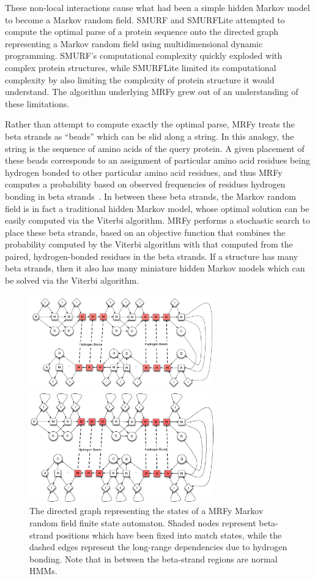 \documentclass[preprint,nonatbib,blockstyle,nocopyrightspace,times]{sigplanconf}
\let\cite\citep
\begin{document}
These non-local interactions cause what had been a simple hidden Markov model 
to become a Markov random field.
SMURF and SMURFLite attempted to compute the 
optimal parse of a protein sequence onto the directed graph representing a 
Markov random field using multidimensional dynamic programming.
SMURF's 
computational complexity quickly exploded with complex protein structures, 
while SMURFLite limited its computational complexity by also limiting the 
complexity of protein structure it would understand.
The algorithm underlying 
MRFy grew out of an understanding of these limitations.


Rather than attempt to compute exactly the optimal parse, MRFy treats the beta 
strands as ``beads'' which can be slid along a string.
In this analogy, the 
string is the sequence of amino acids of the query protein.
A given placement 
of these beads corresponds to an assignment of particular amino acid residues 
being hydrogen bonded to other particular amino acid residues, and thus MRFy 
computes a probability based on observed frequencies of residues hydrogen 
bonding in beta strands~\cite{betawrappro}.
In between these beta strands, the 
Markov random field is in fact a traditional hidden Markov model, whose optimal 
solution can be easily computed via the Viterbi algorithm.
MRFy performs a 
stochastic search to place these beta strands, based on an objective function 
that combines the probability computed by the Viterbi algorithm with that 
computed from the paired, hydrogen-bonded residues in the beta strands.
If a 
structure has many beta strands, then it also has many miniature hidden Markov 
models which can be solved via the Viterbi algorithm.


\begin{figure}[h!] 
\ifpdfmadness
\centerline{\includegraphics[width=8cm]{mrf_interleave_diagram.pdf}} 
\else
\centerline{\includegraphics[width=8cm]{mrf_interleave_diagram.eps}} 
\fi
\caption{The directed graph representing the states of a MRFy Markov random 
field finite state automaton.
Shaded nodes represent beta-strand positions which have been fixed into match states, 
while the dashed edges represent the long-range dependencies due to hydrogen 
bonding.
Note that in between the beta-strand regions are normal HMMs.}\label{mrf} \end{figure}
\end{document}
